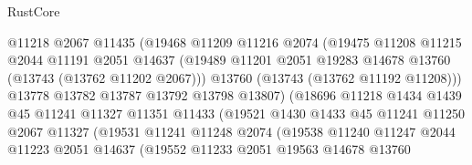 \begin{lexlean}{RustCore}
\begin{coremodule}
                              @11218
                              @2067
                              @11435
                              (@19468
                                @11209
                                @11216
                                @2074
                                (@19475
                                  @11208
                                  @11215
                                  @2044
                                  @11191
                                  @2051
                                  @14637
                                  (@19489
                                    @11201
                                    @2051
                                    @19283
                                    @14678
                                    @13760
                                    (@13743 (@13762 @11202 @2067)))
                                  @13760
                                  (@13743 (@13762 @11192 @11208)))
                                @13778
                                @13782
                                @13787
                                @13792
                                @13798
                                @13807)
                              (@18696
                                @11218
                                @1434
                                @1439
                                @45
                                @11241
                                @11327
                                @11351
                                @11433
                                (@19521
                                  @1430
                                  @1433
                                  @45
                                  @11241
                                  @11250
                                  @2067
                                  @11327
                                  (@19531
                                    @11241
                                    @11248
                                    @2074
                                    (@19538
                                      @11240
                                      @11247
                                      @2044
                                      @11223
                                      @2051
                                      @14637
                                      (@19552
                                        @11233
                                        @2051
                                        @19563
                                        @14678
                                        @13760

\end{coremodule}
\end{lexlean}
